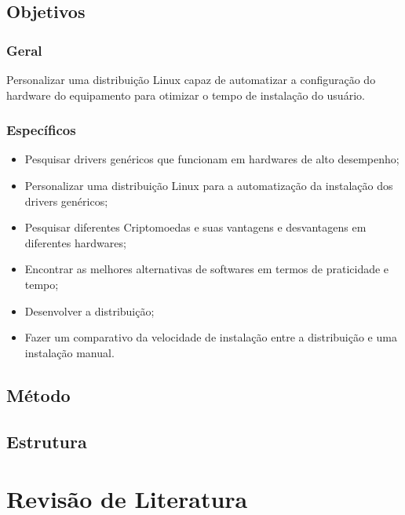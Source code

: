 \documentclass[
article,			%
12pt,				%
openright,			%
oneside,			%
a4paper,			%
chapter=TITLE,		%
section=TITLE,		%
subsection=TITLE,	%
subsubsection=TITLE,%
subsubsubsection=TITLE, %
english,			%
brazil,				%
]{abntex2}
\begin{document}
\subsection{Objetivos}

\subsubsection{Geral}

Personalizar uma distribuição Linux capaz de automatizar a
configuração do hardware do equipamento para otimizar o tempo de
instalação do usuário.

\subsubsection{Específicos}

\begin{itemize} 

    \item Pesquisar drivers genéricos que funcionam em
        hardwares de alto desempenho;

    \item Personalizar uma distribuição Linux para a automatização da
        instalação dos drivers genéricos;

    \item Pesquisar diferentes Criptomoedas e suas vantagens e
        desvantagens em diferentes hardwares;

    \item Encontrar as melhores alternativas de softwares em termos de
        praticidade e tempo;

    \item Desenvolver a distribuição;

    \item Fazer um comparativo da velocidade de instalação entre a
distribuição e uma instalação manual.

\end{itemize}

\subsection{Método}

\subsection{Estrutura}

\section{Revisão de Literatura}
\end{document}
